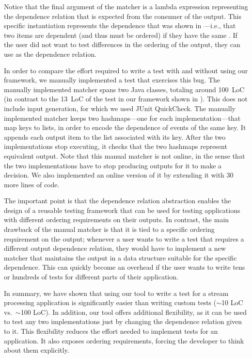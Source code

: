 Notice that the final argument of the matcher is a lambda expression
representing the dependence relation that is expected from the
consumer of the output. This specific instantiation represents the
dependence that was shown in ---i.e., that two items are dependent (and thus must be ordered) if
they have the same . If the user did not want to test
differences in the ordering of the output, they can use
 as the dependence relation.


In order to compare the effort required to write a test with and
without using our framework, we manually implemented a test that
exercises this bug. The manually implemented matcher spans two Java
classes, totaling around 100~LoC (in contrast to the 13~LoC of the
test in our framework shown in ). This does not
include input generation, for which we used JUnit QuickCheck. The
manually implemented matcher keeps two hashmaps---one for each
implementation---that map keys to lists, in order to encode the
dependence of events of the same key. It appends each output item to
the list associated with its key. After the two implementations stop
executing, it checks that the two hashmaps represent equivalent
output. Note that this manual matcher is not online, in the sense that
the two implementations have to stop producing outputs for it to make
a decision. We also implemented an online version of it by extending
it with 30 more lines of code.

The important point is that the dependence relation abstraction
enables the design of a reusable testing framework that can be used
for testing applications with different ordering requirements on their
outputs. In contrast, the main drawback of the manual matcher is that
it is tied to a specific ordering requirement on the output; whenever
a user wants to write a test that requires a different output
dependence relation, they would have to implement a new matcher that
maintains the output in a data structure suitable for the specific
dependence. This can quickly become an overhead if the user wants to
write tens or hundreds of tests for different parts of their
application.

In summary, we have shown that using our tool to write a test for a stream processing application is significantly easier than writing custom tests ($\sim$10 LoC vs.~$\sim$100 LoC). In addition, our tool offers additional flexibility, as it can be used to test any two implementations just by changing the dependence relation given to it. This flexibility reduces the effort needed to implement tests for an application. It also exposes ordering requirements, forcing the developer to think about them explicitly.

